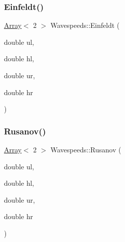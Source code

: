 \subsubsection{\texorpdfstring{Einfeldt()}{Einfeldt()}}
{\footnotesize\ttfamily \hyperlink{Includes_8h_abd9de33944f934950000c3929e14ad8d}{Array}$<$ 2 $>$ Wavespeeds\+::\+Einfeldt (\begin{DoxyParamCaption}\item[{double}]{ul,  }\item[{double}]{hl,  }\item[{double}]{ur,  }\item[{double}]{hr }\end{DoxyParamCaption})}

\mbox{\label{namespaceWavespeeds_a82f960a5ba11c39d153ed7d1fda72cee}} 
\subsubsection{\texorpdfstring{Rusanov()}{Rusanov()}}
{\footnotesize\ttfamily \hyperlink{Includes_8h_abd9de33944f934950000c3929e14ad8d}{Array}$<$ 2 $>$ Wavespeeds\+::\+Rusanov (\begin{DoxyParamCaption}\item[{double}]{ul,  }\item[{double}]{hl,  }\item[{double}]{ur,  }\item[{double}]{hr }\end{DoxyParamCaption})}

